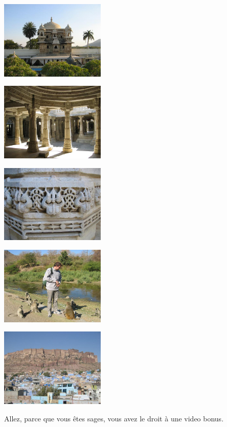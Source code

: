 \begin{multicols}{2}
\smallbreak
\hspace*{-0.65cm}
\includegraphics[width=5cm]{articles/Il-commence-a-faire-chaud/picchola.jpg}
\smallbreak

\smallbreak
\hspace*{-0.65cm}
\includegraphics[width=5cm]{articles/Il-commence-a-faire-chaud/ranak.jpg}
\smallbreak

\smallbreak
\hspace*{-0.65cm}
\includegraphics[width=5cm]{articles/Il-commence-a-faire-chaud/ranak2.jpg}
\smallbreak

\smallbreak
\hspace*{-0.65cm}
\includegraphics[width=5cm]{articles/Il-commence-a-faire-chaud/ranak3.jpg}
\smallbreak

\smallbreak
\hspace*{-0.65cm}
\includegraphics[width=5cm]{articles/Il-commence-a-faire-chaud/ranak4.jpg}
\smallbreak

Allez, parce que vous êtes sages, vous avez le droit à une video bonus.

\end{multicols}


